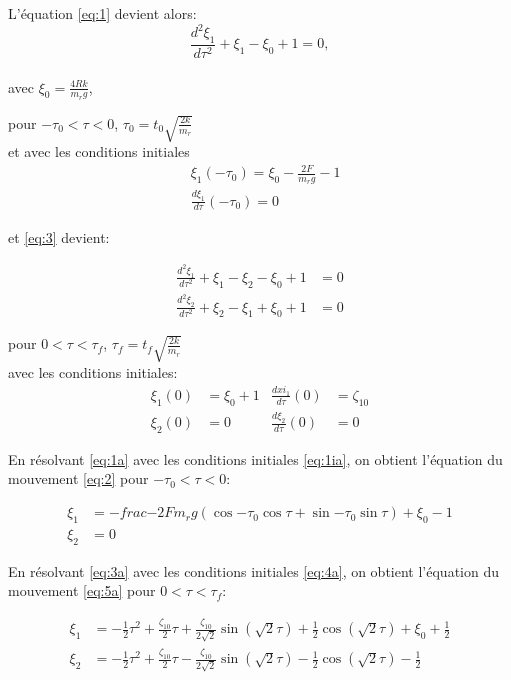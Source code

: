  L'équation \ref{eq:1} devient alors:
\begin{equation}
    \frac{d^2\xi_1}{d\tau^2}+\xi_1-\xi_0+1=0,
  \label{eq:1a}
\end{equation}
\\
avec $\xi_0=\frac{4Rk}{m_r g}$,

pour $-\tau_0<\tau<0$, $\tau_0=t_0 \sqrt{\frac{2k}{m_r}}$\\

et avec les conditions initiales
\begin{align}
    &\xi_1(-\tau_0)=\xi_0-\frac{2F}{m_r g}-1 \nonumber\\
    &\frac{d\xi_1}{d\tau}(-\tau_0)=0
\label{eq:1ia}
\end{align}
 

et \ref{eq:3} devient:

\begin{align}
    \frac{d^2\xi_1}{d\tau^2}+\xi_1-\xi_2-\xi_0+1&=0 \nonumber\\
    \frac{d^2\xi_2}{d\tau^2}+\xi_2-\xi_1+\xi_0+1&=0
  \label{eq:3a}
\end{align}

pour $0<\tau<\tau_f$, $\tau_f=t_f \sqrt{\frac{2k}{m_r}}$ \\
avec les conditions initiales: 
\begin{align}
    \xi_1(0)&=\xi_0+1   &  \frac{d xi_1}{d\tau}(0)&=\zeta_{10} \nonumber\\
    \xi_2(0)&=0   &  \frac{d \xi_2}{d\tau}(0)&=0
  \label{eq:4a}
\end{align} 

En résolvant \ref{eq:1a} avec les conditions initiales \ref{eq:1ia}, on obtient l'équation du mouvement \ref{eq:2} pour $-\tau_0<\tau<0$:

\begin{align}
    \xi_1&=-frac{-2F}{m_r g}(\cos{-\tau_0}\cos{\tau}+\sin{-\tau_0}\sin{\tau})+\xi_0-1 \nonumber\\
    \xi_2&=0
  \label{eq:2}
\end{align}

En résolvant \ref{eq:3a} avec les conditions initiales \ref{eq:4a}, on obtient l'équation du mouvement \ref{eq:5a} pour $0<\tau<\tau_f$:

\begin{align}
    \xi_1&=-\frac{1}{2}\tau^2+\frac{\zeta_{10}}{2}\tau+\frac{\zeta_{10}}{2\sqrt{2}}\sin{(\sqrt{2}\tau)}+\frac{1}{2}\cos{(\sqrt{2}\tau)}+\xi_0+\frac{1}{2} \nonumber\\
    \xi_2&=-\frac{1}{2}\tau^2+\frac{\zeta_{10}}{2}\tau-\frac{\zeta_{10}}{2\sqrt{2}}\sin{(\sqrt{2}\tau)}-\frac{1}{2}\cos{(\sqrt{2}\tau)}-\frac{1}{2}
  \label{eq:5a}
\end{align}

